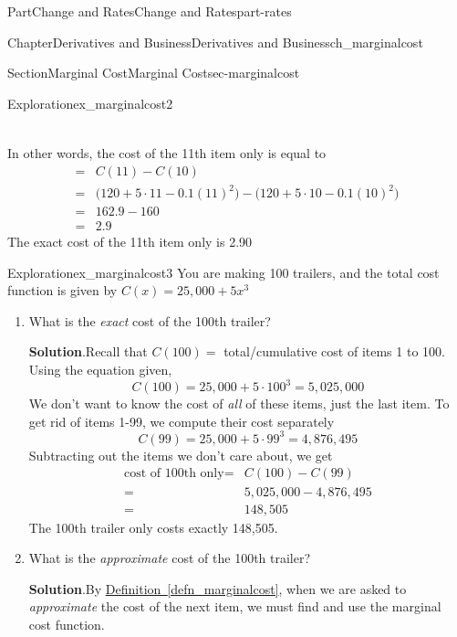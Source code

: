 \documentclass{tufte-book}
\newcommand{\blocktitlefont}{\relax}
\newcommand{\xreffont}{\relax}
\numberwithin{equation}{chapter}
\newcommand{\amp}{&}
\begin{document}
\begin{partptx}{Part}{Change and Rates}{}{Change and Rates}{}{}{part-rates}
\begin{chapterptx}{Chapter}{Derivatives and Business}{}{Derivatives and Business}{}{}{ch_marginalcost}
\begin{sectionptx}{Section}{Marginal Cost}{}{Marginal Cost}{}{}{sec-marginalcost}
\begin{exploration}{Exploration}{}{ex_marginalcost2}
\begin{enumerate}[font=\bfseries,label=(\alph*),ref=\alph*]
\begin{align*}
\end{align*}
%
\par
In other words, the cost of the 11th item only is equal to%
\begin{align*}
= \amp C(11) - C(10)\\
= \amp \Big( 120 + 5\cdot 11 - 0.1(11)^2\Big) - \Big(120 + 5\cdot 10 - 0.1(10)^2\Big)   \\
= \amp 162.9 - 160\\
= \amp 2.9
\end{align*}
The exact cost of the 11th item only is \textdollar{}2.90%
\end{enumerate}%
\end{exploration}%
\begin{exploration}{Exploration}{}{ex_marginalcost3}%
You are making 100 trailers, and the total cost function is given by \(C(x) = 25,000 + 5x^3\)%
\begin{enumerate}[font=\bfseries,label=(\alph*),ref=\alph*]%
\item{}What is the \emph{exact} cost of the 100th trailer?%
\par\smallskip%
\noindent\textbf{\blocktitlefont Solution}.\hypertarget{ex_marginalcost3-2-2}{}\quad{}Recall that \(C(100) = \) total\slash{}cumulative cost of items 1 to 100.  Using the equation given,%
\begin{equation*}
C(100) = 25,000 + 5\cdot 100^3 = 5,025,000
\end{equation*}
We don't want to know the cost of \emph{all} of these items, just the last item.  To get rid of items 1-99, we compute their cost separately%
\begin{equation*}
C(99) = 25,000 + 5\cdot 99^3 = 4,876,495
\end{equation*}
Subtracting out the items we don't care about, we get%
\begin{align*}
\text{cost of 100th only} = \amp C(100) - C(99) \\
= \amp 5,025,000 - 4,876,495\\
= \amp 148,505
\end{align*}
The 100th trailer only costs exactly \textdollar{}148,505.%
\item{}What is the \emph{approximate} cost of the 100th trailer?%
\par\smallskip%
\noindent\textbf{\blocktitlefont Solution}.\hypertarget{ex_marginalcost3-3-2}{}\quad{}By \hyperref[defn_marginalcost]{Definition~{\xreffont\ref{defn_marginalcost}}}, when we are asked to \emph{approximate} the cost of the next item, we must find and use the marginal cost function.%

\end{enumerate}
\end{exploration}
\end{sectionptx}
\end{chapterptx}
\end{partptx}
\end{document}
